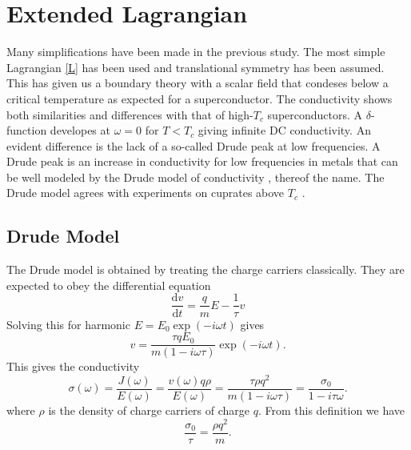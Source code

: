 \documentclass[12pt]{report}
\renewcommand{\d}{\ensuremath{\mathrm{d}}}
\renewcommand{\i}{\ensuremath{i}}
\begin{document}
\chapter{Extended Lagrangian\label{higherOrder}}
Many simplifications have been made in the previous study. The most simple Lagrangian \eqref{L} has been used and translational symmetry has been assumed. This has given us a boundary theory with a scalar field that condeses below a critical temperature as expected for a superconductor. The conductivity shows both similarities and differences with that of high-$T_c$ superconductors. A $\delta$-function developes at $\omega=0$ for $T<T_c$ giving infinite DC conductivity. An evident difference is the lack of a so-called Drude peak at low frequencies. A Drude peak is an increase in conductivity for low frequencies in metals that can be well modeled by the Drude model of conductivity \cite{drude}, thereof the name. The Drude model agrees with experiments on cuprates above $T_c$ \cite{drudeFit}.

\section{Drude Model}
The Drude model is obtained by treating the charge carriers classically. They are expected to obey the differential equation
\begin{equation}
 \frac{\d v}{\d t}=\frac{q}{m}E-\frac{1}{\tau}v
\end{equation}
Solving this for harmonic $E=E_0\exp(-\i\omega t)$ gives 
\begin{equation}
 v=\frac{\tau qE_0}{m(1-\i\omega\tau)}\exp(-\i\omega t).
\end{equation}
This gives the conductivity
\begin{equation}
 \sigma(\omega)=\frac{J(\omega)}{E(\omega)}=\frac{v(\omega)q\rho}{E(\omega)}=\frac{\tau\rho q^2}{m(1-\i\omega\tau)}=\frac{\sigma_0}{1-\i\tau\omega}.
\end{equation}
where $\rho$ is the density of charge carriers of charge $q$. From this definition we have
\begin{equation}
 \frac{\sigma_0}{\tau}=\frac{\rho q^2}{m}.
\end{equation}
\end{document}
